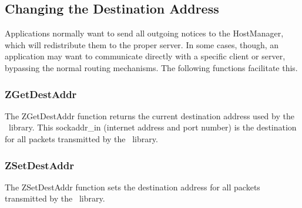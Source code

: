 %
\subsection{Changing the Destination Address}
\label{destination-addr}

Applications normally want to send all outgoing notices to the
HostManager, which will redistribute them to the proper server.  In
some cases, though, an application may want to communicate directly
with a specific client or server, bypassing the normal routing
mechanisms.  The following functions facilitate this.

\subsubsection{ZGetDestAddr}
\label{ZGetDestAddr}

\etemplate
{}

The ZGetDestAddr function returns the current destination address used
by the \Zephyr\ library.  This sockaddr_in (internet address and port
number) is the destination for all packets transmitted by the 
\Zephyr\ library.


\subsubsection{ZSetDestAddr}
\label{ZSetDestAddr}

\etemplate
{}

The ZSetDestAddr function sets the destination address for all packets
transmitted by the \Zephyr\ library.
